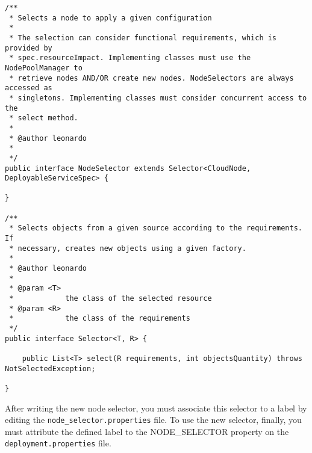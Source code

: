 {\footnotesize
\begin{lstlisting}[caption=\textsf{NodeSelector} interface, label=lst:node_selector]
/**
 * Selects a node to apply a given configuration
 * 
 * The selection can consider functional requirements, which is provided by
 * spec.resourceImpact. Implementing classes must use the NodePoolManager to
 * retrieve nodes AND/OR create new nodes. NodeSelectors are always accessed as
 * singletons. Implementing classes must consider concurrent access to the
 * select method.
 * 
 * @author leonardo
 * 
 */
public interface NodeSelector extends Selector<CloudNode, DeployableServiceSpec> {

}

/**
 * Selects objects from a given source according to the requirements. If
 * necessary, creates new objects using a given factory.
 * 
 * @author leonardo
 * 
 * @param <T>
 *            the class of the selected resource
 * @param <R>
 *            the class of the requirements
 */
public interface Selector<T, R> {

    public List<T> select(R requirements, int objectsQuantity) throws NotSelectedException;

}
\end{lstlisting}
}

After writing the new node selector, you must associate this selector to a label by editing the \texttt{node\_selector.properties} file.
To use the new selector, finally, you must attribute the defined label to the NODE\_SELECTOR property on the \texttt{deployment.properties} file.







